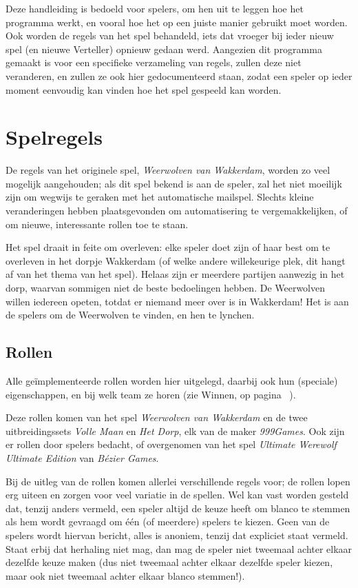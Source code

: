 \documentclass[12pt]{article}
\begin{document}
    Deze handleiding is bedoeld voor spelers, om hen uit te leggen hoe het programma werkt, en vooral hoe het op een juiste manier gebruikt moet worden. Ook worden de regels van het spel behandeld, iets dat vroeger bij ieder nieuw spel (en nieuwe Verteller) opnieuw gedaan werd. Aangezien dit programma gemaakt is voor een specifieke verzameling van regels, zullen deze niet veranderen, en zullen ze ook hier gedocumenteerd staan, zodat een speler op ieder moment eenvoudig kan vinden hoe het spel gespeeld kan worden.

\section{Spelregels}

  De regels van het originele spel, \emph{Weerwolven van Wakkerdam}, worden zo veel mogelijk aangehouden; als dit spel bekend is aan de speler, zal het niet moeilijk zijn om wegwijs te geraken met het automatische mailspel. Slechts kleine veranderingen hebben plaatsgevonden om automatisering te vergemakkelijken, of om nieuwe, interessante rollen toe te staan.

  Het spel draait in feite om overleven: elke speler doet zijn of haar best om te overleven in het dorpje Wakkerdam (of welke andere willekeurige plek, dit hangt af van het thema van het spel). Helaas zijn er meerdere partijen aanwezig in het dorp, waarvan sommigen niet de beste bedoelingen hebben. De Weerwolven willen iedereen opeten, totdat er niemand meer over is in Wakkerdam! Het is aan de spelers om de Weerwolven te vinden, en hen te lynchen.

  \subsection{Rollen} \label{subsec:rollen}

    Alle ge\"implementeerde rollen worden hier uitgelegd, daarbij ook hun (speciale) eigenschappen, en bij welk team ze horen (zie Winnen, op pagina~\pageref{subsec:winnen} ).
  
    Deze rollen komen van het spel \emph{Weerwolven van Wakkerdam} en de twee uitbreidingssets \emph{Volle Maan} en \emph{Het Dorp}, elk van de maker \emph{999Games}. Ook zijn er rollen door spelers bedacht, of overgenomen van het spel \emph{Ultimate Werewolf Ultimate Edition} van \emph{B\'ezier Games}. 
  
    Bij de uitleg van de rollen komen allerlei verschillende regels voor; de rollen lopen erg uiteen en zorgen voor veel variatie in de spellen. Wel kan vast worden gesteld dat, tenzij anders vermeld, een speler altijd de keuze heeft om blanco te stemmen als hem wordt gevraagd om \'e\'en (of meerdere) spelers te kiezen. Geen van de spelers wordt hiervan bericht, alles is anoniem, tenzij dat expliciet staat vermeld. Staat erbij dat herhaling niet mag, dan mag de speler niet tweemaal achter elkaar dezelfde keuze maken (dus niet tweemaal achter elkaar dezelfde speler kiezen, maar ook niet tweemaal achter elkaar blanco stemmen!).
  
\end{document}
